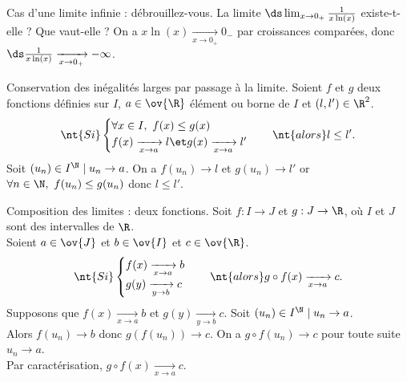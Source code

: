 \documentclass[11pt]{article}
\begin{document}
\vspace*{-0.4cm}

\begin{ex}{Cas d'une limite infinie : débrouillez-vous.}{}
    La limite $\ds\lim_{x\to0_+}\frac{1}{x\ln(x)}$ existe-t-elle ? Que vaut-elle ?
    \tcblower
    On a $x\ln(x)\xrightarrow[x\to0_+]{}0_-$ par croissances comparées, donc $\ds\frac{1}{x\ln(x)}\xrightarrow[x\to0_+]{}-\infty$.
\end{ex}

\vspace*{-0.4cm}

\begin{prop}{Conservation des inégalités larges par passage à la limite.}{}
    Soient $f$ et $g$ deux fonctions définies sur $I$, $a\in\ov{\R}$ élément ou borne de $I$ et $(l,l')\in\R^2$.
    \begin{equation*}
        \nt{Si } \begin{cases}
            \forall x \in I, ~ f(x) \leq g(x)\\
            f(x)\xrightarrow[x\to a]{}l \et g(x)\xrightarrow[x\to a]{}l'
        \end{cases} \quad \nt{alors } l\leq l'.
    \end{equation*}
    \tcblower
    Soit $(u_n)\in I^\N\mid u_n\to a$. On a $f(u_n)\to l$ et $g(u_n)\to l'$ or $\forall n \in \N, ~ f(u_n)\leq g(u_n)$ donc $l\leq l'$.
\end{prop}

\vspace*{-0.4cm}

\begin{prop}{Composition des limites : deux fonctions.}{}
    Soit $f:I\to J$ et $g:J\to \R$, où $I$ et $J$ sont des intervalles de $\R$.\\
    Soient $a\in\ov{J}$ et $b\in\ov{I}$ et $c\in\ov{\R}$.
    \begin{equation*}
        \nt{Si } \begin{cases}
            f(x)\xrightarrow[x\to a]{}b\\
            g(y)\xrightarrow[y\to b]{}c
        \end{cases} \quad \nt{alors } g\circ f(x) \xrightarrow[x\to a]{}c.
    \end{equation*}
    \tcblower
    Supposons que $f(x)\xrightarrow[x\to a]{}b$ et $g(y)\xrightarrow[y\to b]{}c$. Soit $(u_n)\in I^\N\mid u_n\to a$.\\
    Alors $f(u_n)\to b$ donc $g(f(u_n))\to c$. On a $g\circ f(u_n)\to c$ pour toute suite $u_n\to a$.\\
    Par caractérisation, $g\circ f(x)\xrightarrow[x\to a]{}c$.
\end{prop}
\end{document}
